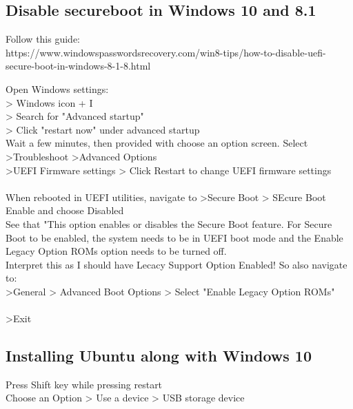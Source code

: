 \documentclass[]{article}
\begin{document}
\subsection{Disable secureboot in Windows 10 and 8.1}
Follow this guide:\\
https://www.windowspasswordsrecovery.com/win8-tips/how-to-disable-uefi-secure-boot-in-windows-8-1-8.html

Open Windows settings: \\
> Windows icon + I\\
> Search for "Advanced startup"\\
> Click "restart now" under advanced startup\\
Wait a few minutes, then provided with choose an option screen. Select >Troubleshoot >Advanced Options\\
>UEFI Firmware settings > Click Restart to change UEFI firmware settings\\\\

When rebooted in UEFI utilities, navigate to >Secure Boot > SEcure Boot Enable and choose Disabled\\
See that "This option enables or disables the Secure Boot feature. For Secure Boot to be enabled, the system needs to be in UEFI boot mode and the Enable Legacy Option ROMs option needs to be turned off.\\
Interpret this as I should have Lecacy Support Option Enabled! So also navigate to:\\
>General > Advanced Boot Options > Select "Enable Legacy Option ROMs"\\ \\

>Exit

\subsection{Installing Ubuntu along with Windows 10}
Press Shift key while pressing restart\\
Choose an Option > Use a device > USB storage device
\end{document}
